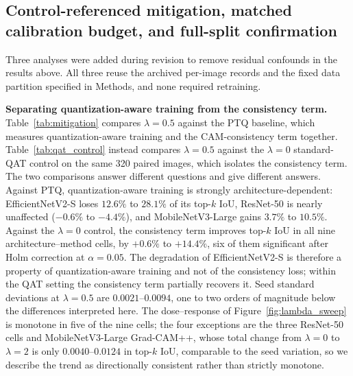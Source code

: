 \documentclass[fleqn,10pt]{wlscirep}
\begin{document}
\subsection*{Control-referenced mitigation, matched calibration budget, and full-split confirmation}

Three analyses were added during revision to remove residual confounds in the results above. All three reuse the archived per-image records and the fixed data partition specified in Methods, and none required retraining.

\textbf{Separating quantization-aware training from the consistency term.} Table~\ref{tab:mitigation} compares $\lambda = 0.5$ against the PTQ baseline, which measures quantization-aware training and the CAM-consistency term together. Table~\ref{tab:qat_control} instead compares $\lambda = 0.5$ against the $\lambda = 0$ standard-QAT control on the same 320 paired images, which isolates the consistency term. The two comparisons answer different questions and give different answers. Against PTQ, quantization-aware training is strongly architecture-dependent: EfficientNetV2-S loses $12.6\%$ to $28.1\%$ of its top-$k$ IoU, ResNet-50 is nearly unaffected ($-0.6\%$ to $-4.4\%$), and MobileNetV3-Large gains $3.7\%$ to $10.5\%$. Against the $\lambda = 0$ control, the consistency term improves top-$k$ IoU in all nine architecture--method cells, by $+0.6\%$ to $+14.4\%$, six of them significant after Holm correction at $\alpha = 0.05$. The degradation of EfficientNetV2-S is therefore a property of quantization-aware training and not of the consistency loss; within the QAT setting the consistency term partially recovers it. Seed standard deviations at $\lambda = 0.5$ are $0.0021$--$0.0094$, one to two orders of magnitude below the differences interpreted here. The dose--response of Figure~\ref{fig:lambda_sweep} is monotone in five of the nine cells; the four exceptions are the three ResNet-50 cells and MobileNetV3-Large Grad-CAM++, whose total change from $\lambda = 0$ to $\lambda = 2$ is only $0.0040$--$0.0124$ in top-$k$ IoU, comparable to the seed variation, so we describe the trend as directionally consistent rather than strictly monotone.
\end{document}
